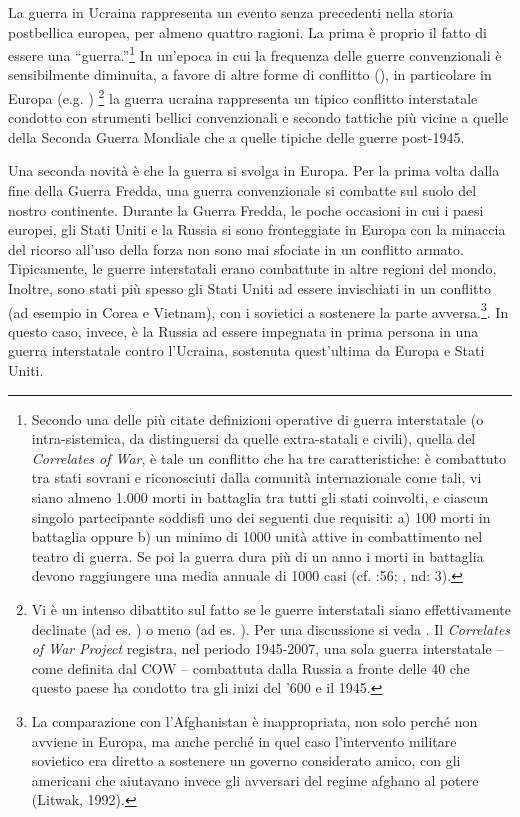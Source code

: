 \documentclass[
  openany]{book}
\begin{document}
La guerra in Ucraina rappresenta un evento senza precedenti nella storia postbellica europea, per almeno quattro ragioni. La prima è proprio il fatto di essere una ``guerra.''\footnote{Secondo una delle più citate definizioni operative di guerra interstatale (o intra-sistemica, da distinguersi da quelle extra-statali e civili), quella del \emph{Correlates of War}, è tale un conflitto che ha tre caratteristiche: è combattuto tra stati sovrani e riconosciuti dalla comunità internazionale come tali, vi siano almeno 1.000 morti in battaglia tra tutti gli stati coinvolti, e ciascun singolo partecipante soddisfi uno dei seguenti due requisiti: a) 100 morti in battaglia oppure b) un minimo di 1000 unità attive in combattimento nel teatro di guerra. Se poi la guerra dura più di un anno i morti in battaglia devono raggiungere una media annuale di 1000 casi (cf. \citet{Small-Singer1982} :56; \citet{Sarkees}, nd: 3).} In un'epoca in cui la frequenza delle guerre convenzionali è sensibilmente diminuita, a favore di altre forme di conflitto (\citet{Sarkees-Wayman-Singer2003}), in particolare in Europa (e.g. \citet{Gaddis1986}) \footnote{Vi è un intenso dibattito sul fatto se le guerre interstatali siano effettivamente declinate (ad es. \citet{Pinker2011}) o meno (ad es. \citet{Braumoeller2019}). Per una discussione si veda \citet{Gleditsch-Pinker-Thayer-Levy-Thompson2013}. Il \emph{Correlates of War Project} registra, nel periodo 1945-2007, una sola guerra interstatale -- come definita dal COW -- combattuta dalla Russia a fronte delle 40 che questo paese ha condotto tra gli inizi del '600 e il 1945.} la guerra ucraina rappresenta un tipico conflitto interstatale condotto con strumenti bellici convenzionali e secondo tattiche più vicine a quelle della Seconda Guerra Mondiale che a quelle tipiche delle guerre post-1945.

Una seconda novità è che la guerra si svolga in Europa. Per la prima volta dalla fine della Guerra Fredda, una guerra convenzionale si combatte sul suolo del nostro continente. Durante la Guerra Fredda, le poche occasioni in cui i paesi europei, gli Stati Uniti e la Russia si sono fronteggiate in Europa con la minaccia del ricorso all'uso della forza non sono mai sfociate in un conflitto armato. Tipicamente, le guerre interstatali erano combattute in altre regioni del mondo, Inoltre, sono stati più spesso gli Stati Uniti ad essere invischiati in un conflitto (ad esempio in Corea e Vietnam), con i sovietici a sostenere la parte avversa.\footnote{La comparazione con l'Afghanistan è inappropriata, non solo perché non avviene in Europa, ma anche perché in quel caso l'intervento militare sovietico era diretto a sostenere un governo considerato amico, con gli americani che aiutavano invece gli avversari del regime afghano al potere (Litwak, 1992).}. In questo caso, invece, è la Russia ad essere impegnata in prima persona in una guerra interstatale contro l'Ucraina, sostenuta quest'ultima da Europa e Stati Uniti.
\end{document}
